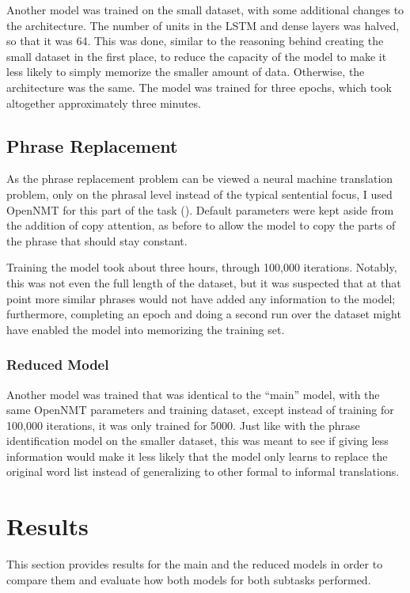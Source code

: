 Another model was trained on the small dataset, with some additional changes to the architecture. The number of units in the LSTM and dense layers was halved, so that it was 64. This was done, similar to the reasoning behind creating the small dataset in the first place, to reduce the capacity of the model to make it less likely to simply memorize the smaller amount of data. Otherwise, the architecture was the same. The model was trained for three epochs, which took altogether approximately three minutes.

\subsection{Phrase Replacement}

As the phrase replacement problem can be viewed a neural machine translation problem, only on the phrasal level instead of the typical sentential focus, I used OpenNMT for this part of the task (\cite{2017opennmt}). Default parameters were kept aside from the addition of copy attention, as before to allow the model to copy the parts of the phrase that should stay constant.

Training the model took about three hours, through 100,000 iterations. Notably, this was not even the full length of the dataset, but it was suspected that at that point more similar phrases would not have added any information to the model; furthermore, completing an epoch and doing a second run over the dataset might have enabled the model into memorizing the training set.

\subsubsection{Reduced Model}

Another model was trained that was identical to the ``main'' model, with the same OpenNMT parameters and training dataset, except instead of training for 100,000 iterations, it was only trained for 5000. Just like with the phrase identification model on the smaller dataset, this was meant to see if giving less information would make it less likely that the model only learns to replace the original word list instead of generalizing to other formal to informal translations.

\section{Results}

This section provides results for the main and the reduced models in order to compare them and evaluate how both models for both subtasks performed.

